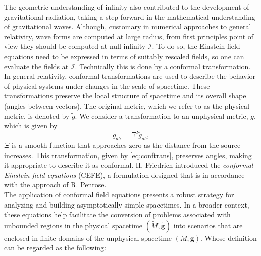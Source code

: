 The geometric understanding of infinity also contributed to the development of gravitational radiation, taking a step forward in the mathematical understanding of gravitational waves. Although, customary in numerical approaches to general relativity, wave forms are computed at large radius, from first principles point of view they should be computed at null infinity $\mathscr{I}$. To do so, the Einstein field equations need to be expressed in terms of suitably rescaled fields, so one can evaluate the fields at $\mathscr{I}$. Technically this is done by a conformal transformation. In general relativity, conformal transformations are used to describe the behavior of physical systems under changes in the scale of spacetime. These transformations preserve the local structure of spacetime and its overall shape (angles between vectors). The original metric, which we refer to as the physical metric, is denoted by $\tilde{g}$. We consider a transformation to an unphysical metric, $g$, which is given by 
\begin{equation}\label{eq:conftrans}
	g_{ab} = \Xi^2 \tilde{g}_{ab},
\end{equation}
$\Xi$ is a smooth function that approaches zero as the distance from the source increases. This transformation, given by \eqref{eq:conftrans}, preserves angles, making it appropriate to describe it as conformal. H. Friedrich introduced the \textit{conformal Einstein field
equations} (CEFE), a formulation designed that is in accordance with
the approach of R. Penrose.\\
\noindent
The application of conformal field equations presents a robust strategy for analyzing and building asymptotically simple spacetimes. In a broader context, these equations help facilitate the conversion of problems associated with unbounded regions in the physical spacetime $(\tilde{{M}}, \boldsymbol{\tilde{g}})$ into scenarios that are enclosed in finite domains of the unphysical spacetime $({{M}},\boldsymbol{g})$. Whose definition can be regarded as the following: \\
